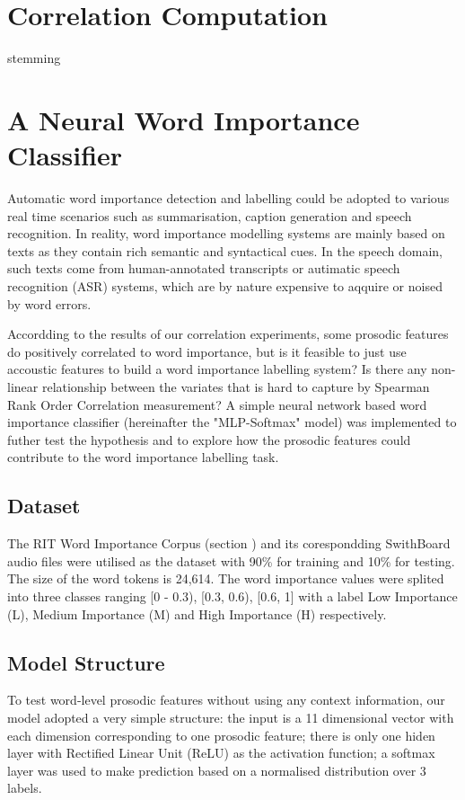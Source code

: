 \section{Correlation Computation}
stemming

\section{A Neural Word Importance Classifier}
Automatic word importance detection and labelling could be adopted to various real time scenarios such as summarisation, caption generation and speech recognition. In reality, word importance modelling systems are mainly based on texts as they contain rich semantic and syntactical cues. In the speech domain, such texts come from human-annotated transcripts or autimatic speech recognition (ASR) systems, which are by nature expensive to aqquire or noised by word errors.

Accordding to the results of our correlation experiments, some prosodic features do positively correlated to word importance, but is it feasible to just use accoustic features to build a word importance labelling system? Is there any non-linear relationship between the variates that is hard to capture by Spearman Rank Order Correlation measurement?  A simple neural network based word importance classifier (hereinafter the "MLP-Softmax" model) was implemented to futher test the hypothesis and to explore how the prosodic features could contribute to the word importance labelling task.

\subsection{Dataset}
The RIT Word Importance Corpus (section   ) and its corespondding SwithBoard audio files were utilised as the dataset with 90\% for training and 10\% for testing. The size of the word tokens is 24,614. The word importance values were splited into three classes ranging [0 - 0.3), [0.3, 0.6), [0.6, 1] with a label Low Importance (L), Medium Importance (M) and High Importance (H) respectively. 

\subsection{Model Structure}
To test word-level prosodic features without using any context information, our model adopted a very simple structure: the input is a 11 dimensional vector with each dimension corresponding to one prosodic feature; there is only one hiden layer with Rectified Linear Unit (ReLU) as the activation function; a softmax layer was used to make prediction based on a normalised distribution over 3 labels.

